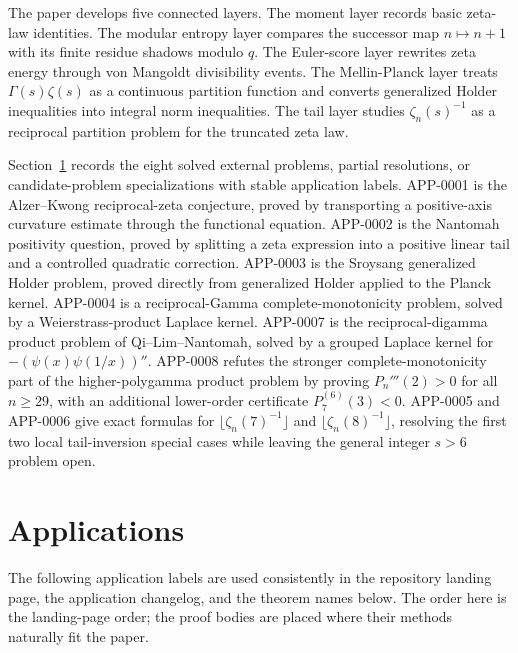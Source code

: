 \documentclass[11pt]{article}
\numberwithin{equation}{section}
\theoremstyle{definition}
\theoremstyle{remark}
\newcommand{\1}{\mathbf 1}
\begin{document}
The paper develops five connected layers.  The moment layer records basic zeta-law identities.  The modular entropy layer compares the successor map \(n\mapsto n+1\) with its finite residue shadows modulo \(q\).  The Euler-score layer rewrites zeta energy through von Mangoldt divisibility events.  The Mellin-Planck layer treats \(\Gamma(s)\zeta(s)\) as a continuous partition function and converts generalized Holder inequalities into integral norm inequalities.  The tail layer studies \(\zeta_n(s)^{-1}\) as a reciprocal partition problem for the truncated zeta law.

Section~\ref{sec:applications} records the eight solved external problems, partial resolutions, or candidate-problem specializations with stable application labels.  APP-0001 is the Alzer--Kwong reciprocal-zeta conjecture, proved by transporting a positive-axis curvature estimate through the functional equation.  APP-0002 is the Nantomah positivity question, proved by splitting a zeta expression into a positive linear tail and a controlled quadratic correction.  APP-0003 is the Sroysang generalized Holder problem, proved directly from generalized Holder applied to the Planck kernel.  APP-0004 is a reciprocal-Gamma complete-monotonicity problem, solved by a Weierstrass-product Laplace kernel.  APP-0007 is the reciprocal-digamma product problem of Qi--Lim--Nantomah, solved by a grouped Laplace kernel for \(-(\psi(x)\psi(1/x))''\).  APP-0008 refutes the stronger complete-monotonicity part of the higher-polygamma product problem by proving \(P_n'''(2)>0\) for all \(n\ge29\), with an additional lower-order certificate \(P_7^{(6)}(3)<0\).  APP-0005 and APP-0006 give exact formulas for \(\lfloor \zeta_n(7)^{-1}\rfloor\) and \(\lfloor \zeta_n(8)^{-1}\rfloor\), resolving the first two local tail-inversion special cases while leaving the general integer \(s>6\) problem open.

\section{Applications}
\label{sec:applications}

The following application labels are used consistently in the repository landing page, the application changelog, and the theorem names below.  The order here is the landing-page order; the proof bodies are placed where their methods naturally fit the paper.
\end{document}
